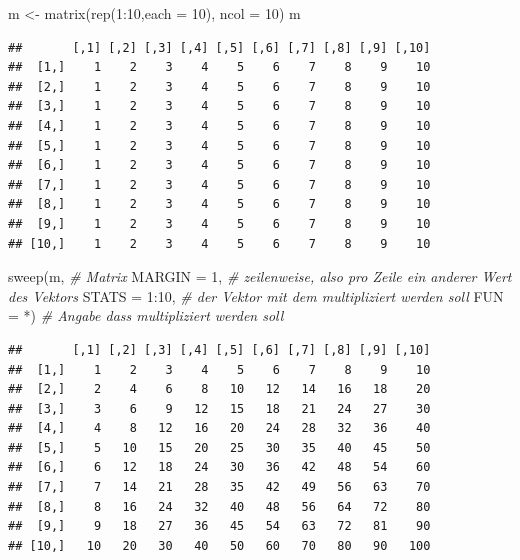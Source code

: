 \documentclass[
]{book}
\newenvironment{Shaded}{\begin{snugshade}}{\end{snugshade}}
\newcommand{\AttributeTok}[1]{\textcolor[rgb]{0.77,0.63,0.00}{#1}}
\newcommand{\CommentTok}[1]{\textcolor[rgb]{0.56,0.35,0.01}{\textit{#1}}}
\newcommand{\DecValTok}[1]{\textcolor[rgb]{0.00,0.00,0.81}{#1}}
\newcommand{\FunctionTok}[1]{\textcolor[rgb]{0.00,0.00,0.00}{#1}}
\newcommand{\NormalTok}[1]{#1}
\newcommand{\OtherTok}[1]{\textcolor[rgb]{0.56,0.35,0.01}{#1}}
\newcommand{\SpecialCharTok}[1]{\textcolor[rgb]{0.00,0.00,0.00}{#1}}
\newcommand{\StringTok}[1]{\textcolor[rgb]{0.31,0.60,0.02}{#1}}
\begin{document}
\begin{Shaded}
\begin{Highlighting}[]
\NormalTok{m }\OtherTok{\textless{}{-}} \FunctionTok{matrix}\NormalTok{(}\FunctionTok{rep}\NormalTok{(}\DecValTok{1}\SpecialCharTok{:}\DecValTok{10}\NormalTok{,}\AttributeTok{each =} \DecValTok{10}\NormalTok{), }\AttributeTok{ncol =} \DecValTok{10}\NormalTok{)}
\NormalTok{m}
\end{Highlighting}
\end{Shaded}

\begin{verbatim}
##       [,1] [,2] [,3] [,4] [,5] [,6] [,7] [,8] [,9] [,10]
##  [1,]    1    2    3    4    5    6    7    8    9    10
##  [2,]    1    2    3    4    5    6    7    8    9    10
##  [3,]    1    2    3    4    5    6    7    8    9    10
##  [4,]    1    2    3    4    5    6    7    8    9    10
##  [5,]    1    2    3    4    5    6    7    8    9    10
##  [6,]    1    2    3    4    5    6    7    8    9    10
##  [7,]    1    2    3    4    5    6    7    8    9    10
##  [8,]    1    2    3    4    5    6    7    8    9    10
##  [9,]    1    2    3    4    5    6    7    8    9    10
## [10,]    1    2    3    4    5    6    7    8    9    10
\end{verbatim}

\begin{Shaded}
\begin{Highlighting}[]
\FunctionTok{sweep}\NormalTok{(m, }\CommentTok{\# Matrix}
      \AttributeTok{MARGIN =} \DecValTok{1}\NormalTok{, }\CommentTok{\# zeilenweise, also pro Zeile ein anderer Wert des Vektors}
      \AttributeTok{STATS =} \DecValTok{1}\SpecialCharTok{:}\DecValTok{10}\NormalTok{, }\CommentTok{\# der Vektor mit dem multipliziert werden soll}
      \AttributeTok{FUN =} \StringTok{\textquotesingle{}*\textquotesingle{}}\NormalTok{) }\CommentTok{\# Angabe dass multipliziert werden soll}
\end{Highlighting}
\end{Shaded}

\begin{verbatim}
##       [,1] [,2] [,3] [,4] [,5] [,6] [,7] [,8] [,9] [,10]
##  [1,]    1    2    3    4    5    6    7    8    9    10
##  [2,]    2    4    6    8   10   12   14   16   18    20
##  [3,]    3    6    9   12   15   18   21   24   27    30
##  [4,]    4    8   12   16   20   24   28   32   36    40
##  [5,]    5   10   15   20   25   30   35   40   45    50
##  [6,]    6   12   18   24   30   36   42   48   54    60
##  [7,]    7   14   21   28   35   42   49   56   63    70
##  [8,]    8   16   24   32   40   48   56   64   72    80
##  [9,]    9   18   27   36   45   54   63   72   81    90
## [10,]   10   20   30   40   50   60   70   80   90   100
\end{verbatim}
\end{document}
